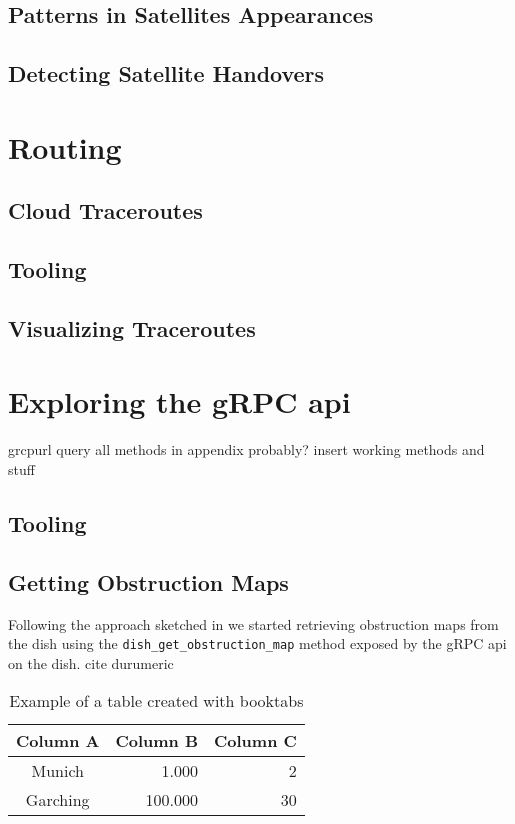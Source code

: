 \documentclass[IN,11pt,twoside,openright,bachelor,english]{tumthesis}
\begin{document}
\section{Patterns in Satellites Appearances}
\section{Detecting Satellite Handovers}

\chapter{Routing}
\section{Cloud Traceroutes}
\section{Tooling}
\section{Visualizing Traceroutes}


\chapter{Exploring the gRPC api}

grcpurl
query all methods
in appendix probably? insert working methods and stuff


\section{Tooling}
\section{Getting Obstruction Maps}
Following the approach sketched in \cite{izhikevich2023democratizing} we started retrieving obstruction maps from the dish using the \texttt{dish\_get\_obstruction\_map} method exposed by the gRPC api on the dish.
cite durumeric

\begin{table}
	\centering
	\begin{tabular}{c r r}
		\toprule
		Column A & Column B & Column C \\
		\midrule
		Munich   &    1.000 &        2 \\
		Garching &  100.000 &       30 \\
		\bottomrule
	\end{tabular}
	\caption{Example of a table created with booktabs}
	\label{tab:tabular}
\end{table}
\end{document}
